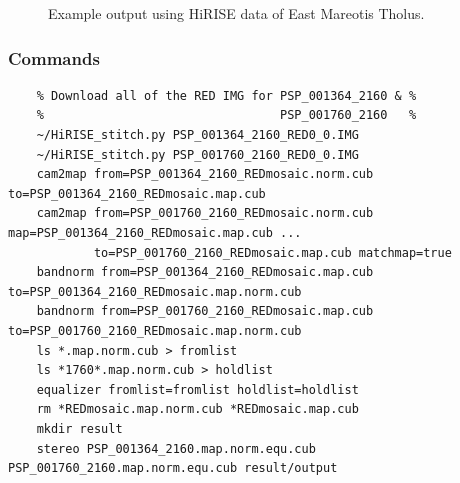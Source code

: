 \begin{figure}[h!]
\centering
  \hfil
\caption{Example output using HiRISE data of East Mareotis Tholus.}
\label{fig:hirise_emare_example}
\end{figure}

\subsubsection*{Commands}

\begin{verbatim}
    % Download all of the RED IMG for PSP_001364_2160 & %
    %                                 PSP_001760_2160   %
    ~/HiRISE_stitch.py PSP_001364_2160_RED0_0.IMG
    ~/HiRISE_stitch.py PSP_001760_2160_RED0_0.IMG
    cam2map from=PSP_001364_2160_REDmosaic.norm.cub to=PSP_001364_2160_REDmosaic.map.cub
    cam2map from=PSP_001760_2160_REDmosaic.norm.cub map=PSP_001364_2160_REDmosaic.map.cub ...
            to=PSP_001760_2160_REDmosaic.map.cub matchmap=true
    bandnorm from=PSP_001364_2160_REDmosaic.map.cub to=PSP_001364_2160_REDmosaic.map.norm.cub
    bandnorm from=PSP_001760_2160_REDmosaic.map.cub to=PSP_001760_2160_REDmosaic.map.norm.cub
    ls *.map.norm.cub > fromlist
    ls *1760*.map.norm.cub > holdlist
    equalizer fromlist=fromlist holdlist=holdlist
    rm *REDmosaic.map.norm.cub *REDmosaic.map.cub
    mkdir result
    stereo PSP_001364_2160.map.norm.equ.cub PSP_001760_2160.map.norm.equ.cub result/output
\end{verbatim}

